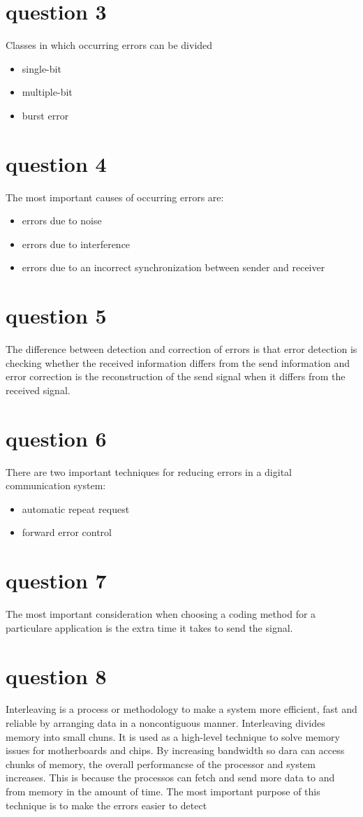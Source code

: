 \documentclass[final]{scrreprt} %
\begin{document}
\section{question 3}
Classes in which occurring errors can be divided
\begin{itemize}
\item single-bit
\item multiple-bit
\item burst error
\end{itemize}
\section{question 4}
The most important causes of occurring errors are:
\begin{itemize}
\item errors due to noise
\item errors due to interference
\item errors due to an incorrect synchronization between sender and receiver
\end{itemize}
\section{question 5}
The difference between detection and correction of errors is that error detection is checking whether the received information differs from the send information and error correction is the reconstruction of the send signal when it differs from the received signal. 
\section{question 6}
There are two important techniques for reducing errors in a digital communication system:
\begin{itemize}
\item automatic repeat request
\item forward error control
\end{itemize}
\section{question 7}
The most important consideration when choosing a coding method for a particulare application is the extra time it takes to send the signal.
\section{question 8}
Interleaving is a process or methodology to make a system more efficient, fast and reliable by arranging data in a noncontiguous manner.
Interleaving divides memory into small chuns. 
It is used as a high-level technique to solve memory issues for motherboards and chips.
By increasing bandwidth so dara can access chunks of memory, the overall performancse of the processor and system increases. 
This is because the processos can fetch and send more data to and from memory in the amount of time.
The most important purpose of this technique is to make the errors easier to detect 
\end{document}
